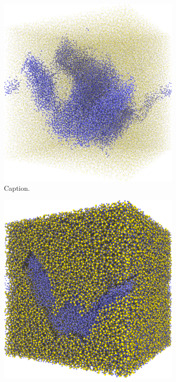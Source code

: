 %
\begin{figure}[htpb]%
    \centering%
    \setlength{\myfigwidth}{0.49\textwidth}%
%
    \begin{subfigure}[b]{\myfigwidth}%
        \centering%
        \includegraphics[width=\textwidth]{images/systems/trimmed-rough_fracture03_05}%
        \caption{Caption.}%
    \end{subfigure}%
    \hfill%
    \begin{subfigure}[b]{\myfigwidth}%
        \centering%
        \includegraphics[width=\textwidth]{images/systems/trimmed-rough_fracture03_06}%

\end{subfigure}
\end{figure}
